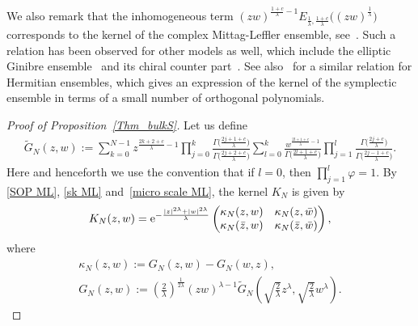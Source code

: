 We also remark that the inhomogeneous term $(zw)^{ \frac{1+c}{\lambda}-1 } E_{ \frac{1}{\lambda},\frac{1+c}{\lambda} } \big( (zw)^{\frac{1}{\lambda}} \big)$ corresponds to the kernel of the complex Mittag-Leffler ensemble, see~\cite{ameur2018random}.
Such a relation has been observed for other models as well, which include the elliptic Ginibre ensemble~\cite{BE} and its chiral counter part~\cite{MR2180006}.
See also~\cite{MR1762659,MR1675356} for a similar relation for Hermitian ensembles, which gives an expression of the kernel of the symplectic ensemble in terms of a small number of orthogonal polynomials.

\begin{proof}[Proof of Proposition~\ref{Thm_bulkS}]
	Let us define
	\begin{gather*} %
		\widetilde{G}_{N}(z,w):=\sum_{k=0}^{N-1}z^{ \frac{2k+2+c}{\lambda}-1 } \prod_{j=0}^k \frac{ \Gamma\big( \frac{2j+1+c}{\lambda} \big) }{\Gamma\big( \frac{2j+2+c}{\lambda} \big)}
		\sum_{l=0}^{k} \frac{ w^{ \frac{2l+1+c}{\lambda}-1 } }{\Gamma\big( \frac{2l+1+c}{\lambda}\big)} \prod_{j=1}^l \frac{\Gamma\big( \frac{2j+c}{\lambda} \big)}{ \Gamma\big(\frac{2j-1+c}{\lambda}\big) } .
	\end{gather*}
	Here and henceforth we use the convention that if $l=0$, then $\prod_{j=1}^l \varphi=1$.
	By \eqref{SOP ML}, \eqref{sk ML} and~\eqref{micro scale ML}, the kernel $K_N$ is given by
	\begin{gather*}
			K_N(z,w)
			={\rm e}^{ -\frac{ |z|^{2\lambda}+|w|^{2\lambda} }{\lambda} } \begin{pmatrix}
				\kappa_N(z,w) & \kappa_N(z,\bar{w}) \\
				\kappa_N(\bar{z},w) & \kappa_N(\bar{z},\bar{w})
			\end{pmatrix},
		\end{gather*}
	where
	\begin{gather*}
		\kappa_N(z,w):=G_N(z,w)-G_N(w,z), \\ G_N(z,w):=\left( \frac{2}{\lambda} \right)^{\frac{1}{2\lambda}} (zw)^{\lambda-1} \widetilde{G}_N \left( \sqrt{ \frac{2}{\lambda} } z^\lambda, \sqrt{ \frac{2}{\lambda} } w^\lambda \right).
	\end{gather*}
	

\end{proof}
